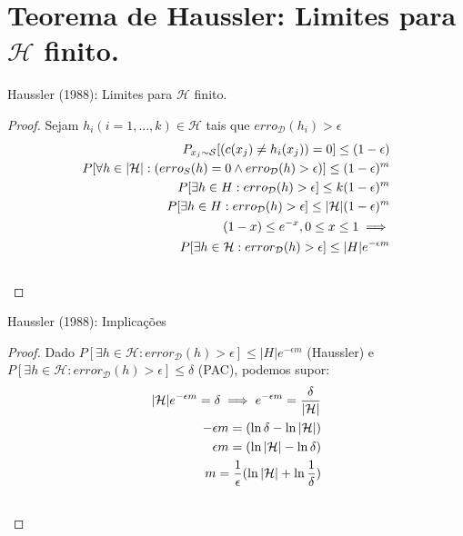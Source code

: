 \documentclass[10pt, professionalfonts]{beamer}
\begin{document}
{

  \AtBeginSection{}
  \section{Teorema de Haussler: Limites para $\mathcal{H}$ finito.}
  \begin{frame}{Haussler (1988): Limites para $\mathcal{H}$ finito.}
    \noindent{}
    \pause
    \begin{proof}  Sejam $h_i (i = 1, ..., k) \in \mathcal{H}$ tais que $erro_{\mathcal{D}}(h_i)>\epsilon$
      \begin{align}
      P_{x_j\sim\mathcal{S}}[(c(x_j) \neq h_i(x_j))=0] \leq (1-\epsilon) \label{haussler:a} \\
      P[\forall h \in |\mathcal{H}|: (erro_{S}(h)=0 \land erro_{\mathcal{D}}(h)> \epsilon)] \leq (1-\epsilon)^m \label{haussler:b} \\
      P[\exists h \in H: erro_{\mathcal{D}}(h)>\epsilon]\leq k (1-\epsilon)^m \label{haussler:c} \\
      P[\exists h \in H: erro_{\mathcal{D}}(h)>\epsilon]\leq |\mathcal{H}| (1-\epsilon)^m \label{haussler:d} \\ 
      (1-x) \leq e^{-x}, 0 \leq x \leq 1 \implies \nonumber \\ P[\exists h \in \mathcal{H}: error_{\mathcal{D}}(h)>\epsilon]\leq |H|e^{-\epsilon m}  \label{haussler:e} \\
      \qedhere
      \end{align}
      \end{proof}
      

  \end{frame}
\begin{frame}{Haussler (1988): Implicações}
  \noindent{}
\pause
\begin{proof}  Dado $P[\exists h \in \mathcal{H}: error_{\mathcal{D}}(h)>\epsilon]\leq |H|e^{-\epsilon m}$ (Haussler) e $P[\exists h \in \mathcal{H}: error_{\mathcal{D}}(h)>\epsilon]\leq \delta$ (PAC), podemos supor:
\begin{align}
    |\mathcal{H}|e^{-\epsilon m}=\delta \implies e^{-\epsilon m} = \frac{\delta}{|\mathcal{H}|} \\
    - \epsilon m = (\ln{\delta} - \ln{|\mathcal{H}|})  \\
    \epsilon m = (\ln{|\mathcal{H}|} - \ln{\delta}) \\
    m = \frac{1}{\epsilon}(\ln{|\mathcal{H}|} + \ln{\frac{1}{\delta}}) \\
    \qedhere
\end{align}
\end{proof}

\end{frame}
}
\end{document}
